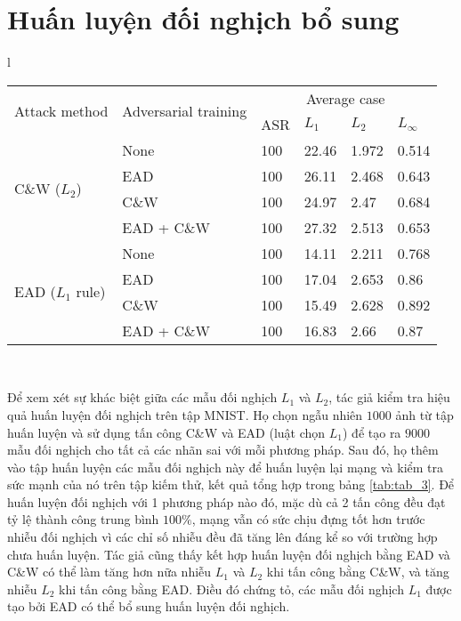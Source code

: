 \section{Huấn luyện đối nghịch bổ sung}
\begin{longtable}{l}
	\begin{tabular}{ll|llll}
		\hline
		\multirow{2}{*}{Attack method} & \multirow{2}{*}{Adversarial training} & \multicolumn{4}{c}{Average case} \\
		& & ASR & $L_1$ & $L_2$ & $L_\infty$ \\
		\hline
		\multirow{4}{*}{C\&W ($L_2$)} & None & 100 & 22.46 & 1.972 & 0.514 \\
		& EAD & 100 & 26.11 & 2.468 & 0.643 \\
		& C\&W & 100 & 24.97 & 2.47 & 0.684 \\
		& EAD + C\&W & 100 & 27.32 & 2.513 & 0.653 \\
		\hline
		\multirow{4}{*}{EAD ($L_1$ rule)} & None & 100 & 14.11 & 2.211 & 0.768 \\
		& EAD & 100 & 17.04 & 2.653 & 0.86 \\
		& C\&W & 100 & 15.49 & 2.628 & 0.892 \\
		& EAD + C\&W & 100 & 16.83 & 2.66 & 0.87 \\
		\hline
	\end{tabular} \\
	\caption[Huấn luyện đối nghịch sử dụng tấn công C\&W và EAD (luật $L_1$) trên tập dữ liệu MNIST]{Huấn luyện đối nghịch sử dụng tấn công C\&W và EAD (luật $L_1$) trên tập dữ liệu MNIST. ASR là tỷ lệ tấn công thành công. Kết hợp các mẫu $L_1$ bổ sung cho huấn luyện đối nghịch và tăng cường độ khó của tấn công về phương diện nhiễu. Kết quả đầy đủ có trong tài liệu mở rộng.}
	\label{tab:tab_3}
\end{longtable}	

Để xem xét sự khác biệt giữa các mẫu đối nghịch $L_1$ và $L_2$, tác giả kiểm tra hiệu quả huấn luyện đối nghịch trên tập MNIST. Họ chọn ngẫu nhiên $1000$ ảnh từ tập huấn luyện và sử dụng tấn công C\&W và EAD (luật chọn $L_1$) để tạo ra $9000$ mẫu đối nghịch cho tất cả các nhãn sai với mỗi phương pháp. Sau đó, họ thêm vào tập huấn luyện các mẫu đối nghịch này để huấn luyện lại mạng và kiểm tra sức mạnh của nó trên tập kiếm thử, kết quả tổng hợp trong bảng \ref{tab:tab_3}. Để huấn luyện đối nghịch với 1 phương pháp nào đó, mặc dù cả 2 tấn công đều đạt tỷ lệ thành công trung bình $100\%$, mạng vẫn có sức chịu đựng tốt hơn trước nhiễu đối nghịch vì các chỉ số nhiễu đều đã tăng lên đáng kể so với trường hợp chưa huấn luyện. Tác giả cũng thấy kết hợp huấn luyện đối nghịch bằng EAD và C\&W có thể làm tăng hơn nữa nhiễu $L_1$ và $L_2$ khi tấn công bằng C\&W, và tăng nhiễu $L_2$ khi tấn công bằng EAD. Điều đó chứng tỏ, các mẫu đối nghịch $L_1$ được tạo bởi EAD có thể bổ sung huấn luyện đối nghịch.  

